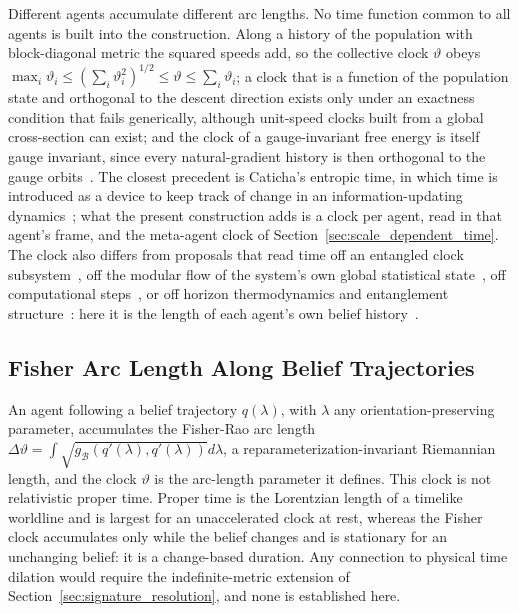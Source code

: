 \documentclass[11pt]{article}
\begin{document}
Different agents accumulate different arc lengths. No time function common to all agents is built into the construction. Along a history of the population with block-diagonal metric the squared speeds add, so the collective clock $\vartheta$ obeys $\max_i \vartheta_i \le (\sum_i \vartheta_i^2)^{1/2} \le \vartheta \le \sum_i \vartheta_i$; a clock that is a function of the population state and orthogonal to the descent direction exists only under an exactness condition that fails generically, although unit-speed clocks built from a global cross-section can exist; and the clock of a gauge-invariant free energy is itself gauge invariant, since every natural-gradient history is then orthogonal to the gauge orbits~\cite[Ch.~7]{DennisGaugeVFE2026}. The closest precedent is Caticha's entropic time, in which time is introduced as a device to keep track of change in an information-updating dynamics~\cite{Caticha2011entropic}; what the present construction adds is a clock per agent, read in that agent's frame, and the meta-agent clock of Section~\ref{sec:scale_dependent_time}. The clock also differs from proposals that read time off an entangled clock subsystem~\cite{PageWootters1983}, off the modular flow of the system's own global statistical state~\cite{ConnesRovelli1994}, off computational steps~\cite{Lloyd2002}, or off horizon thermodynamics and entanglement structure~\cite{Jacobson1995, VanRaamsdonk2010}: here it is the length of each agent's own belief history~\cite{Wheeler1990, Rovelli2004}.

\subsection{Fisher Arc Length Along Belief Trajectories}
\label{sec:fisher_arc_length}

An agent following a belief trajectory $q(\lambda)$, with $\lambda$ any orientation-preserving parameter, accumulates the Fisher-Rao arc length $\Delta\vartheta = \int \sqrt{g_{\mathcal{B}}(q'(\lambda), q'(\lambda))} d\lambda$, a reparameterization-invariant Riemannian length, and the clock $\vartheta$ is the arc-length parameter it defines. This clock is not relativistic proper time. Proper time is the Lorentzian length of a timelike worldline and is largest for an unaccelerated clock at rest, whereas the Fisher clock accumulates only while the belief changes and is stationary for an unchanging belief: it is a change-based duration. Any connection to physical time dilation would require the indefinite-metric extension of Section~\ref{sec:signature_resolution}, and none is established here.
\end{document}
